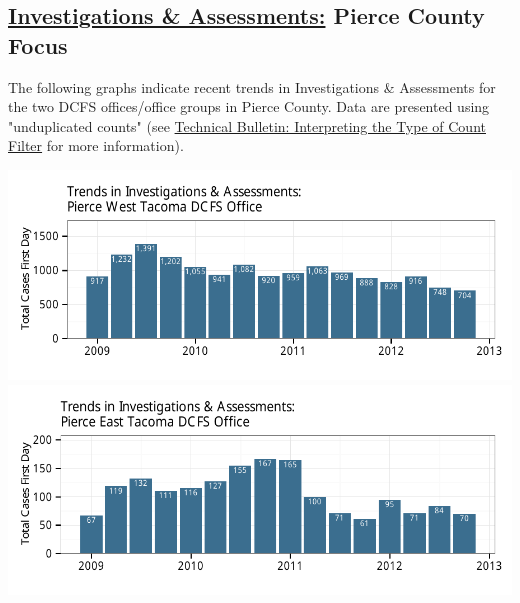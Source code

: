 \documentclass{article}\usepackage{graphicx, color}
\makeatletter
\def\maxwidth{ %
  \ifdim\Gin@nat@width>\linewidth
    \linewidth
  \else
    \Gin@nat@width
  \fi
}
\newenvironment{knitrout}{}{} %
\makeatother
\begin{document}
\subsection{\href{http://www.partnersforourchildren.org//child-well-being/visualizations/investigations-assessments/trends}
{Investigations \& Assessments:} Pierce County Focus}
The following graphs indicate recent trends in Investigations \& Assessments for the two DCFS offices/office groups in Pierce County.
Data are presented using "unduplicated counts" (see \href{http://http://www.partnersforourchildren.org/publications/using-different-count-types-data-portal}{Technical Bulletin: Interpreting the Type of Count Filter} for more information).  
\nopagebreak[2]
\begin{knitrout}
\color{fgcolor}

{\centering \includegraphics[width=\maxwidth]{figure/ia_focus1} 
\includegraphics[width=\maxwidth]{figure/ia_focus2} 

}



\end{knitrout}
\end{document}
